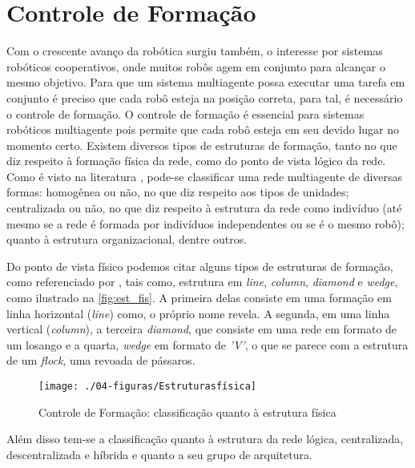 \section{Controle de Formação}
\label{sec:controleFormacao}
Com o crescente avanço da robótica surgiu também, o interesse por sistemas robóticos cooperativos, onde muitos robôs agem em conjunto para alcançar o mesmo objetivo. Para que um sistema multiagente possa executar uma tarefa em conjunto é preciso que cada robô esteja na posição correta, para tal, é necessário o controle de formação. O controle de formação é essencial para sistemas robóticos multiagente pois permite que cada robô esteja em seu devido lugar no momento certo. Existem diversos tipos de estruturas de formação, tanto no que diz respeito à formação física da rede, como do ponto de vista lógico da rede. Como é visto na literatura \cite{leal2009reconfigurable}, pode-se classificar uma rede multiagente de diversas formas: homogênea ou não, no que diz respeito aos tipos de unidades; centralizada ou não, no que diz respeito à estrutura da rede como indivíduo (até mesmo se a rede é formada por indivíduos independentes ou se é o mesmo robô); quanto à estrutura organizacional, dentre outros. 

Do ponto de vista físico podemos citar alguns tipos de estruturas de formação, como referenciado por , tais como, estrutura em \emph{line}, \emph{column}, \emph{diamond} e \emph{wedge}, como ilustrado na \autoref{fig:est_fis}. A primeira delas consiste em uma formação em linha horizontal (\emph{line}) como, o próprio nome revela. A segunda, em uma linha vertical (\emph{column}), a terceira \emph{diamond}, que consiste em uma rede em formato de um losango e a quarta, \emph{wedge} em formato de \emph{'V'}, o que se parece com a estrutura de um \emph{flock}, uma revoada de pássaros. 

\begin{figure}[!htb]
	\centering
	\texttt{[image: ./04-figuras/Estruturasfísica]}
	\caption{Controle de Formação: classificação quanto à estrutura física}	
	\label{fig:est_fis}
\end{figure}

Além disso tem-se a classificação quanto à estrutura da rede lógica, centralizada, descentralizada e híbrida e quanto a seu grupo de arquitetura. %

